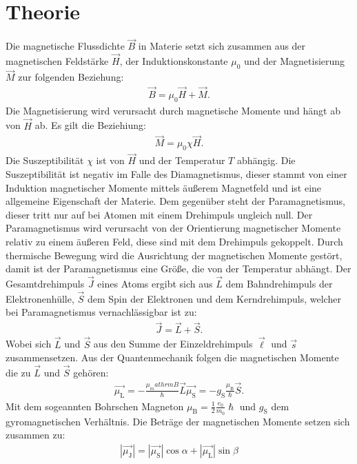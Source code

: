 \section{Theorie}
\label{sec:Theorie}
Die magnetische Flussdichte $\vec{B}$ in Materie setzt sich zusammen aus der magnetischen Feldstärke $\vec{H}$,
der Induktionskonstante $\mu_\mathrm{0}$ und der Magnetisierung $\vec{M}$ zur
folgenden Beziehung:
\begin{align}
  \vec{B}=\mu_\mathrm{0}\vec{H}+\vec{M}.
\end{align}
Die Magnetisierung wird verursacht durch magnetische Momente und hängt ab
von $\vec{H}$ ab. Es gilt die Beziehiung:
\begin{align}
  \vec{M}=\mu_\mathrm{0}\chi\vec{H}.
\end{align}
Die Suszeptibilität $\chi$ ist von $\vec{H}$ und der Temperatur $T$ abhängig.
Die Suszeptibilität ist negativ im Falle des Diamagnetismus,
dieser stammt von einer Induktion magnetischer Momente mittels äußerem
Magnetfeld und ist eine allgemeine Eigenschaft der Materie.
Dem gegenüber steht der Paramagnetismus, dieser tritt nur auf bei
Atomen mit einem Drehimpuls ungleich null. Der Paramagnetismus wird
verursacht von der Orientierung magnetischer Momente relativ
zu einem äußeren Feld, diese sind mit dem Drehimpuls gekoppelt.
Durch thermische Bewegung wird die Ausrichtung der magnetischen Momente
gestört, damit ist der Paramagnetismus eine Größe, die von der Temperatur
abhängt.
Der Gesamtdrehimpuls $\vec{J}$ eines Atoms ergibt sich aus
$\vec{L}$ dem Bahndrehimpuls der Elektronenhülle, $\vec{S}$ dem Spin
der Elektronen und dem Kerndrehimpuls, welcher bei Paramagnetismus
vernachlässigbar ist zu:
\begin{align}
  \vec{J}=\vec{L}+\vec{S}.
\end{align}
Wobei sich $\vec{L}$ und $\vec{S}$ aus den Summe der  Einzeldrehimpuls $\vec{\ell}$
und $\vec{s}$ zusammensetzen.
Aus der Quantenmechanik folgen die magnetischen Momente die zu $\vec{L}$ und $\vec{S}$
gehören:
\begin{align}
  \vec{\mu_\mathrm{L}}=-\frac{\mu_mathrm{B}}{\hslash}\vec{L}
  \vec{\mu_\mathrm{S}}=-g_\mathrm{S}\frac{\mu_\mathrm{B}}{\hslash}\vec{S}.
\end{align}
Mit dem sogeannten Bohrschen Magneton $\mu_\mathrm{B}=\frac{1}{2}\frac{e_0}{m_0}\hslash$
und $g_\mathrm{S}$ dem gyromagnetischen Verhältnis.
Die Beträge der magnetischen Momente setzen sich zusammen zu:
\begin{align}
  |\vec{\mu_\mathrm{J}}|=|\vec{\mu_\mathrm{S}}|\cos{\alpha}+|\vec{\mu_\mathrm{L}}|\sin{\beta}
\end{align}
